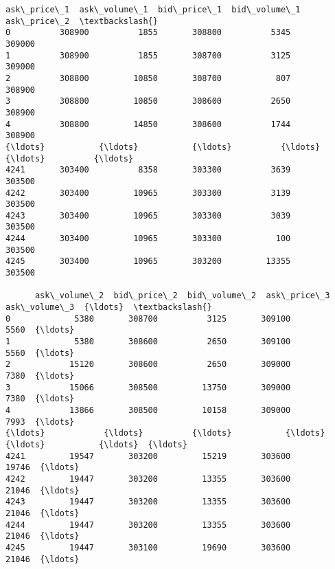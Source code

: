 \documentclass[11pt]{article}
\begin{document}
\begin{scriptsize}
            \begin{tcolorbox}[breakable, size=fbox, boxrule=.5pt, pad at break*=1mm, opacityfill=0]
\begin{Verbatim}[commandchars=\\\{\}]
      ask\_price\_1  ask\_volume\_1  bid\_price\_1  bid\_volume\_1  ask\_price\_2  \textbackslash{}
0          308900          1855       308800          5345       309000
1          308900          1855       308700          3125       309000
2          308800         10850       308700           807       308900
3          308800         10850       308600          2650       308900
4          308800         14850       308600          1744       308900
{\ldots}           {\ldots}           {\ldots}          {\ldots}           {\ldots}          {\ldots}
4241       303400          8358       303300          3639       303500
4242       303400         10965       303300          3139       303500
4243       303400         10965       303300          3039       303500
4244       303400         10965       303300           100       303500
4245       303400         10965       303200         13355       303500

      ask\_volume\_2  bid\_price\_2  bid\_volume\_2  ask\_price\_3  ask\_volume\_3  {\ldots}  \textbackslash{}
0             5380       308700          3125       309100          5560  {\ldots}
1             5380       308600          2650       309100          5560  {\ldots}
2            15120       308600          2650       309000          7380  {\ldots}
3            15066       308500         13750       309000          7380  {\ldots}
4            13866       308500         10158       309000          7993  {\ldots}
{\ldots}            {\ldots}          {\ldots}           {\ldots}          {\ldots}           {\ldots}  {\ldots}
4241         19547       303200         15219       303600         19746  {\ldots}
4242         19447       303200         13355       303600         21046  {\ldots}
4243         19447       303200         13355       303600         21046  {\ldots}
4244         19447       303200         13355       303600         21046  {\ldots}
4245         19447       303100         19690       303600         21046  {\ldots}


\end{Verbatim}
\end{tcolorbox}
\end{scriptsize}
\end{document}
